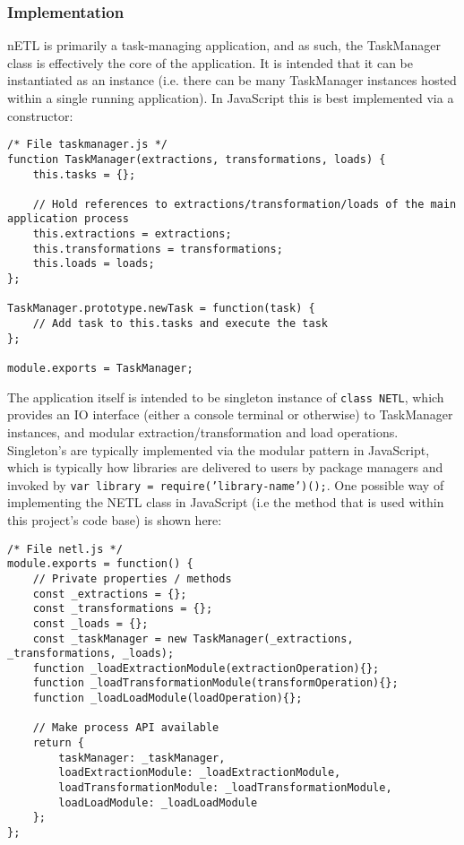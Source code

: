 \subsubsection{Implementation}
nETL is primarily a task-managing application, and as such, the TaskManager class is effectively the core of the application. It is intended that it can be instantiated as an instance (i.e. there can be many TaskManager instances hosted within a single running application). In JavaScript this is best implemented via a constructor:

\begin{verbatim}
/* File taskmanager.js */
function TaskManager(extractions, transformations, loads) {
    this.tasks = {};

    // Hold references to extractions/transformation/loads of the main application process
    this.extractions = extractions;
    this.transformations = transformations;
    this.loads = loads;
};

TaskManager.prototype.newTask = function(task) {
    // Add task to this.tasks and execute the task
};

module.exports = TaskManager;
\end{verbatim}

The application itself is intended to be singleton instance of \texttt{class NETL{}}, which provides an IO interface (either a console terminal or otherwise) to TaskManager instances, and modular extraction/transformation and load operations. Singleton's are typically implemented via the modular pattern in JavaScript, which is typically how libraries are delivered to users by package managers and invoked by \texttt{var library = require('library-name')();}. One possible way of implementing the NETL class in JavaScript (i.e the method that is used within this project's code base) is shown here:

\begin{verbatim}
/* File netl.js */
module.exports = function() {
    // Private properties / methods
    const _extractions = {};
    const _transformations = {};
    const _loads = {};        
    const _taskManager = new TaskManager(_extractions, _transformations, _loads);
    function _loadExtractionModule(extractionOperation){};
    function _loadTransformationModule(transformOperation){};
    function _loadLoadModule(loadOperation){};

    // Make process API available
    return {
        taskManager: _taskManager,
        loadExtractionModule: _loadExtractionModule,
        loadTransformationModule: _loadTransformationModule,
        loadLoadModule: _loadLoadModule
    };
};
\end{verbatim}